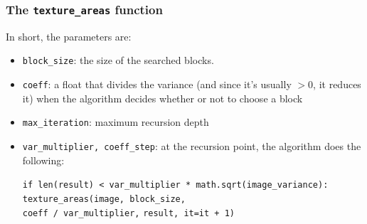 \begin{frame}
    \frametitle{The \texttt{texture\_areas} function}

    In short, the parameters are:
    \begin{itemize}
        \item<1-> \texttt{block\_size}: the size of the searched blocks.
        \item<2-> \texttt{coeff}: a float that divides the variance (and since it's usually $> 0$, it reduces it) when the algorithm decides whether or not to choose a block
        \item<3-> \texttt{max\_iteration}: maximum recursion depth
        \item<4-> \texttt{var\_multiplier, coeff\_step}: at the recursion point, the algorithm does the following:

              \texttt{if len(result) < var\_multiplier * math.sqrt(image\_variance):}\\
              \texttt{\hphantom{hhhhh}texture\_areas(image, block\_size,}\\
                  \texttt{\hphantom{hhhhhhhhhhhhhhhhhhh}coeff / var\_multiplier,} \texttt{\hphantom{hhhhhhhhhhhhhhhhhhh}result, it=it + 1)}

    \end{itemize}
\end{frame}

